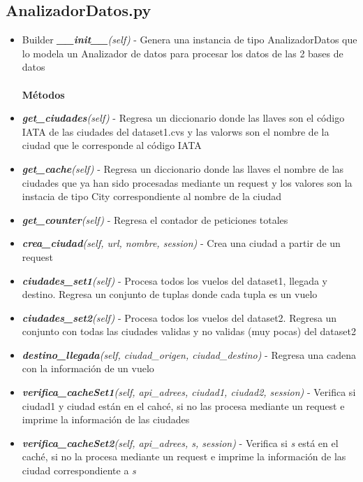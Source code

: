\documentclass{article}
\begin{document}
        \subsection{AnalizadorDatos.py}
            \begin{itemize}
            \item Builder \textit{\textbf{\_\_init\_\_}(self)} - Genera una instancia de tipo AnalizadorDatos que lo modela un Analizador de datos para procesar los datos de las 2 bases de datos \\\\
            \textbf{Métodos}
            \item \textit{\textbf{get\_ciudades}(self)} - Regresa un diccionario donde las llaves son el código IATA de las ciudades del dataset1.cvs y las valorws son el nombre de la ciudad que le corresponde al código IATA
            \item \textit{\textbf{get\_cache}(self)} - Regresa un diccionario donde las llaves el nombre de las ciudades que ya han sido procesadas mediante un request y los valores son la instacia de tipo City correspondiente al nombre de la ciudad
            \item \textit{\textbf{get\_counter}(self)} - Regresa el contador de peticiones totales
            \item \textit{\textbf{crea\_ciudad}(self, url, nombre, session)} - Crea una ciudad a partir de un request 
            \item \textit{\textbf{ciudades\_set1}(self)} - Procesa todos los vuelos del dataset1, llegada y destino. Regresa un conjunto de tuplas donde cada tupla es un vuelo 
            \item \textit{\textbf{ciudades\_set2}(self)} - Procesa todos los vuelos del dataset2. Regresa un conjunto con todas las ciudades validas y no validas (muy pocas) del dataset2 
            \item \textit{\textbf{destino\_llegada}(self, ciudad\_origen, ciudad\_destino)} - Regresa una cadena con la información de un vuelo 
            \item \textit{\textbf{verifica\_cacheSet1}(self, api\_adrees, ciudad1, ciudad2, session)} - Verifica si ciudad1 y ciudad están en el cahcé, si no las procesa mediante un request e imprime la información de las ciudades
            \item \textit{\textbf{verifica\_cacheSet2}(self, api\_adrees, s, session)} - Verifica si \textit{s} está en el caché, si no la procesa mediante un request e imprime la información de las ciudad correspondiente a \textit{s}

\end{itemize}
\end{document}
